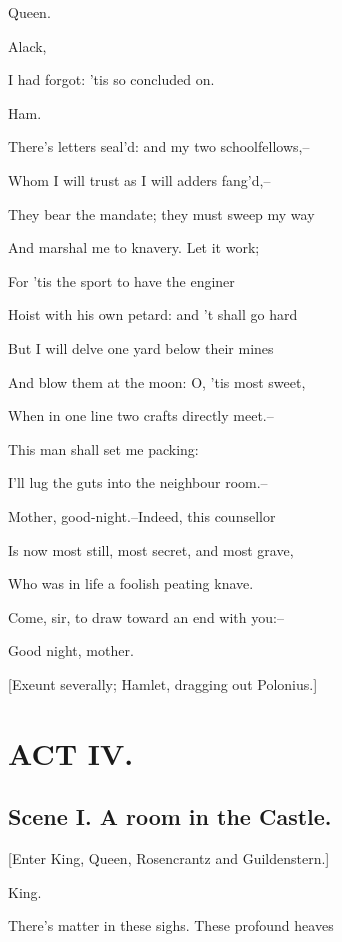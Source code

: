 \documentclass[12pt]{book}
\begin{document}
Queen.

Alack,

I had forgot: 'tis so concluded on.



Ham.

There's letters seal'd: and my two schoolfellows,--

Whom I will trust as I will adders fang'd,--

They bear the mandate; they must sweep my way

And marshal me to knavery. Let it work;

For 'tis the sport to have the enginer

Hoist with his own petard: and 't shall go hard

But I will delve one yard below their mines

And blow them at the moon: O, 'tis most sweet,

When in one line two crafts directly meet.--

This man shall set me packing:

I'll lug the guts into the neighbour room.--

Mother, good-night.--Indeed, this counsellor

Is now most still, most secret, and most grave,

Who was in life a foolish peating knave.

Come, sir, to draw toward an end with you:--

Good night, mother.



[Exeunt severally; Hamlet, dragging out Polonius.]







\chapter*{ACT IV.}



\section*{Scene I. A room in the Castle.}



[Enter King, Queen, Rosencrantz and Guildenstern.]



King.

There's matter in these sighs. These profound heaves
\end{document}
